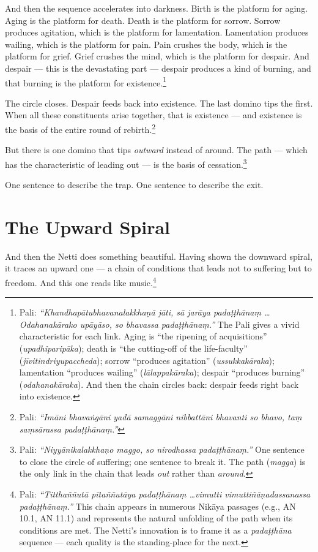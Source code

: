 And then the sequence accelerates into darkness. Birth is the platform for aging. Aging is the platform for death. Death is the platform for sorrow. Sorrow produces agitation, which is the platform for lamentation. Lamentation produces wailing, which is the platform for pain. Pain crushes the body, which is the platform for grief. Grief crushes the mind, which is the platform for despair. And despair --- this is the devastating part --- despair produces a kind of burning, and that burning is the platform for existence.\footnote{Pali: \textit{``Khandhapātubhavanalakkhaṇā jāti, sā jarāya padaṭṭhānaṃ \ldots Odahanakārako upāyāso, so bhavassa padaṭṭhānaṃ.''} The Pali gives a vivid characteristic for each link. Aging is ``the ripening of acquisitions'' (\textit{upadhiparipāka}); death is ``the cutting-off of the life-faculty'' (\textit{jīvitindriyupaccheda}); sorrow ``produces agitation'' (\textit{ussukkakāraka}); lamentation ``produces wailing'' (\textit{lālappakāraka}); despair ``produces burning'' (\textit{odahanakāraka}). And then the chain circles back: despair feeds right back into existence.}

The circle closes. Despair feeds back into existence. The last domino tips the first. When all these constituents arise together, that is existence --- and existence is the basis of the entire round of rebirth.\footnote{Pali: \textit{``Imāni bhavaṅgāni yadā samaggāni nibbattāni bhavanti so bhavo, taṃ saṃsārassa padaṭṭhānaṃ.''}}

But there is one domino that tips \textit{outward} instead of around. The path --- which has the characteristic of leading out --- is the basis of cessation.\footnote{Pali: \textit{``Niyyānikalakkhaṇo maggo, so nirodhassa padaṭṭhānaṃ.''} One sentence to close the circle of suffering; one sentence to break it. The path (\textit{magga}) is the only link in the chain that leads \textit{out} rather than \textit{around}.}

One sentence to describe the trap. One sentence to describe the exit.

\section*{The Upward Spiral}

And then the Netti does something beautiful. Having shown the downward spiral, it traces an upward one --- a chain of conditions that leads not to suffering but to freedom. And this one reads like music.\footnote{Pali: \textit{``Titthaññutā pītaññutāya padaṭṭhānaṃ \ldots vimutti vimuttiñāṇadassanassa padaṭṭhānaṃ.''} This chain appears in numerous Nikāya passages (e.g., AN 10.1, AN 11.1) and represents the natural unfolding of the path when its conditions are met. The Netti's innovation is to frame it as a \textit{padaṭṭhāna} sequence --- each quality is the standing-place for the next.}

